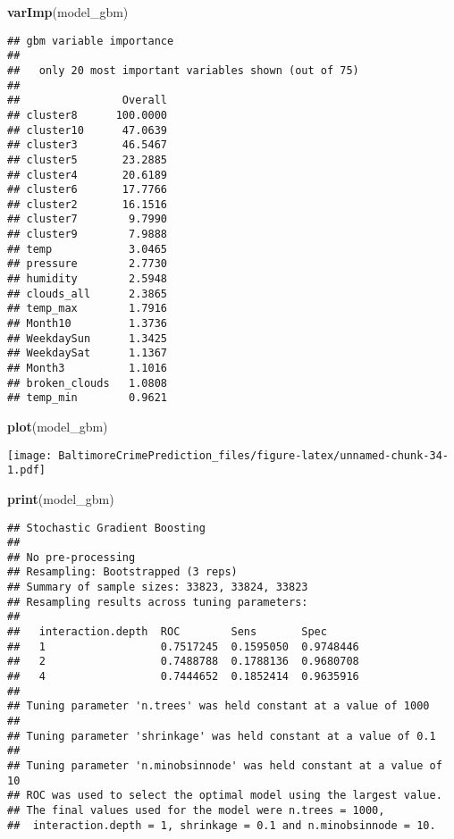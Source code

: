 \documentclass[]{article}
\newenvironment{Shaded}{\begin{snugshade}}{\end{snugshade}}
\newcommand{\KeywordTok}[1]{\textcolor[rgb]{0.13,0.29,0.53}{\textbf{#1}}}
\newcommand{\NormalTok}[1]{#1}
\begin{document}
\begin{Shaded}
\begin{Highlighting}[]
\KeywordTok{varImp}\NormalTok{(model_gbm)}
\end{Highlighting}
\end{Shaded}

\begin{verbatim}
## gbm variable importance
## 
##   only 20 most important variables shown (out of 75)
## 
##                Overall
## cluster8      100.0000
## cluster10      47.0639
## cluster3       46.5467
## cluster5       23.2885
## cluster4       20.6189
## cluster6       17.7766
## cluster2       16.1516
## cluster7        9.7990
## cluster9        7.9888
## temp            3.0465
## pressure        2.7730
## humidity        2.5948
## clouds_all      2.3865
## temp_max        1.7916
## Month10         1.3736
## WeekdaySun      1.3425
## WeekdaySat      1.1367
## Month3          1.1016
## broken_clouds   1.0808
## temp_min        0.9621
\end{verbatim}

\begin{Shaded}
\begin{Highlighting}[]
\KeywordTok{plot}\NormalTok{(model_gbm)}
\end{Highlighting}
\end{Shaded}

\texttt{[image: BaltimoreCrimePrediction\_files/figure-latex/unnamed-chunk-34-1.pdf]}

\begin{Shaded}
\begin{Highlighting}[]
\KeywordTok{print}\NormalTok{(model_gbm)}
\end{Highlighting}
\end{Shaded}

\begin{verbatim}
## Stochastic Gradient Boosting 
## 
## No pre-processing
## Resampling: Bootstrapped (3 reps) 
## Summary of sample sizes: 33823, 33824, 33823 
## Resampling results across tuning parameters:
## 
##   interaction.depth  ROC        Sens       Spec     
##   1                  0.7517245  0.1595050  0.9748446
##   2                  0.7488788  0.1788136  0.9680708
##   4                  0.7444652  0.1852414  0.9635916
## 
## Tuning parameter 'n.trees' was held constant at a value of 1000
## 
## Tuning parameter 'shrinkage' was held constant at a value of 0.1
## 
## Tuning parameter 'n.minobsinnode' was held constant at a value of 10
## ROC was used to select the optimal model using the largest value.
## The final values used for the model were n.trees = 1000,
##  interaction.depth = 1, shrinkage = 0.1 and n.minobsinnode = 10.
\end{verbatim}
\end{document}
